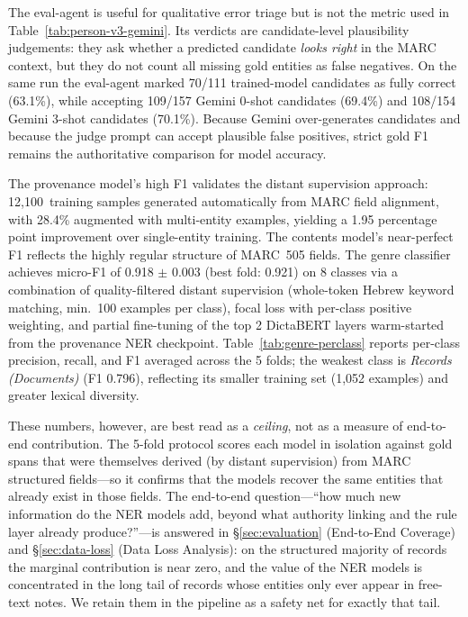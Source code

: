\documentclass[Afour,sageh,times]{sagej}
\begin{document}
The eval-agent is useful for qualitative error triage but is not the metric used in Table~\ref{tab:person-v3-gemini}. Its verdicts are candidate-level plausibility judgements: they ask whether a predicted candidate \emph{looks right} in the MARC context, but they do not count all missing gold entities as false negatives. On the same run the eval-agent marked 70/111 trained-model candidates as fully correct (63.1\%), while accepting 109/157 Gemini 0-shot candidates (69.4\%) and 108/154 Gemini 3-shot candidates (70.1\%). Because Gemini over-generates candidates and because the judge prompt can accept plausible false positives, strict gold F1 remains the authoritative comparison for model accuracy.

The provenance model's high F1 validates the distant supervision approach: 12,100~training samples generated automatically from MARC field alignment, with 28.4\% augmented with multi-entity examples, yielding a 1.95 percentage point improvement over single-entity training. The contents model's near-perfect F1 reflects the highly regular structure of MARC~505 fields. The genre classifier achieves micro-F1 of 0.918 $\pm$ 0.003 (best fold: 0.921) on 8 classes via a combination of quality-filtered distant supervision (whole-token Hebrew keyword matching, min.\ 100 examples per class), focal loss with per-class positive weighting, and partial fine-tuning of the top 2 DictaBERT layers warm-started from the provenance NER checkpoint. Table~\ref{tab:genre-perclass} reports per-class precision, recall, and F1 averaged across the 5 folds; the weakest class is \emph{Records (Documents)} (F1 0.796), reflecting its smaller training set (1,052 examples) and greater lexical diversity.

These numbers, however, are best read as a \emph{ceiling}, not as a measure of end-to-end contribution. The 5-fold protocol scores each model in isolation against gold spans that were themselves derived (by distant supervision) from MARC structured fields---so it confirms that the models recover the same entities that already exist in those fields. The end-to-end question---``how much new information do the NER models add, beyond what authority linking and the rule layer already produce?''---is answered in \S\ref{sec:evaluation} (End-to-End Coverage) and \S\ref{sec:data-loss} (Data Loss Analysis): on the structured majority of records the marginal contribution is near zero, and the value of the NER models is concentrated in the long tail of records whose entities only ever appear in free-text notes. We retain them in the pipeline as a safety net for exactly that tail.
\end{document}
